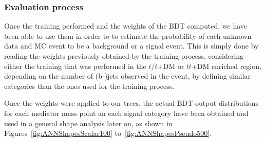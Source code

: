 \documentclass[a4paper, 10pt, openright]{report}
\begin{document}

\subsubsection{Evaluation process}

Once the training performed and the weights of the \ac{BDT} computed, we have been able to use them in order to to estimate the probability of each unknown data and \ac{MC} event to be a background or a signal event. This is simply done by reading the weights previously obtained by the training process, considering either the training that was performed in the $t/\bar t$+DM or $t \bar t$+DM enriched region, depending on the number of (b-)jets observed in the event, by defining similar categories than the ones used for the training process.

Once the weights were applied to our trees, the actual \ac{BDT} output distributions for each mediator mass point an each signal category have been obtained and used in a general shape analysis later on, as shown in Figures~\ref{fig:ANNShapesScalar100} to~\ref{fig:ANNShapesPseudo500}.

\end{document}

